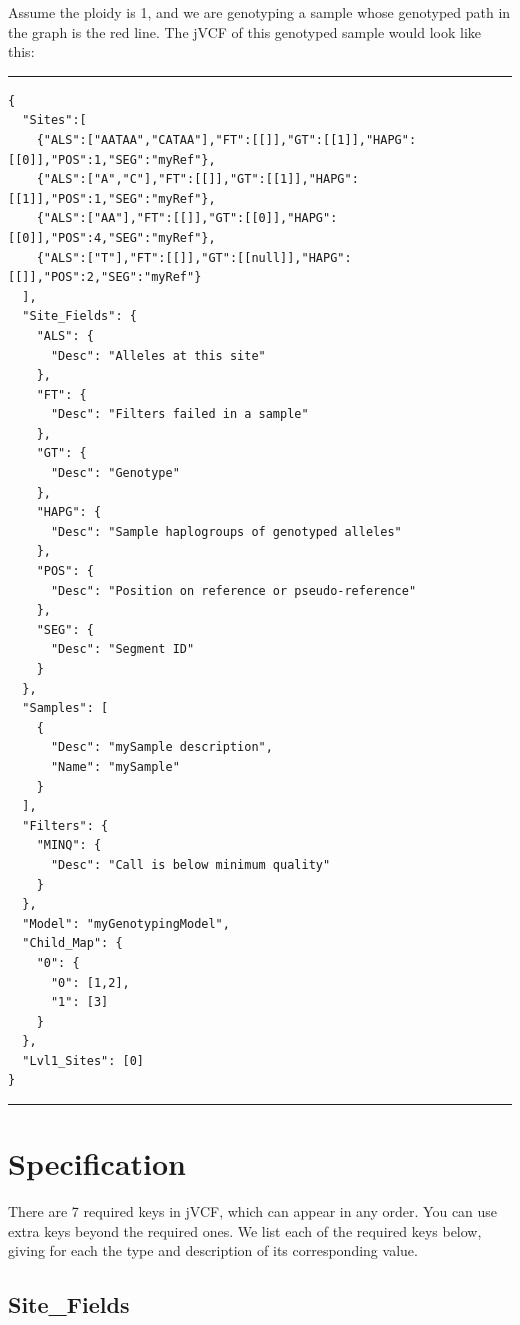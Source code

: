 Assume the ploidy is 1, and we are genotyping a sample whose genotyped
path in the graph is the red line. The jVCF of this genotyped sample
would look like this:

\newpage

\begin{center}\rule{0.5\linewidth}{0.5pt}\end{center}

\begin{verbatim}
{
  "Sites":[
    {"ALS":["AATAA","CATAA"],"FT":[[]],"GT":[[1]],"HAPG":[[0]],"POS":1,"SEG":"myRef"},
    {"ALS":["A","C"],"FT":[[]],"GT":[[1]],"HAPG":[[1]],"POS":1,"SEG":"myRef"},
    {"ALS":["AA"],"FT":[[]],"GT":[[0]],"HAPG":[[0]],"POS":4,"SEG":"myRef"},
    {"ALS":["T"],"FT":[[]],"GT":[[null]],"HAPG":[[]],"POS":2,"SEG":"myRef"}
  ],
  "Site_Fields": {
    "ALS": {
      "Desc": "Alleles at this site"
    },
    "FT": {
      "Desc": "Filters failed in a sample"
    },
    "GT": {
      "Desc": "Genotype"
    },
    "HAPG": {
      "Desc": "Sample haplogroups of genotyped alleles"
    },
    "POS": {
      "Desc": "Position on reference or pseudo-reference"
    },
    "SEG": {
      "Desc": "Segment ID"
    }
  },
  "Samples": [
    {
      "Desc": "mySample description",
      "Name": "mySample"
    }
  ],
  "Filters": {
    "MINQ": {
      "Desc": "Call is below minimum quality"
    }
  },
  "Model": "myGenotypingModel",
  "Child_Map": {
    "0": {
      "0": [1,2],
      "1": [3]
    }
  },
  "Lvl1_Sites": [0]
}
\end{verbatim}

\begin{center}\rule{0.5\linewidth}{0.5pt}\end{center}

\newpage

\hypertarget{specification}{%
\section{Specification}\label{specification}}

There are 7 required keys in jVCF, which can appear in any order. You
can use extra keys beyond the required ones. We list each of the
required keys below, giving for each the type and description of its
corresponding value.

\hypertarget{site_fields}{%
\subsection{Site\_Fields}\label{site_fields}}

